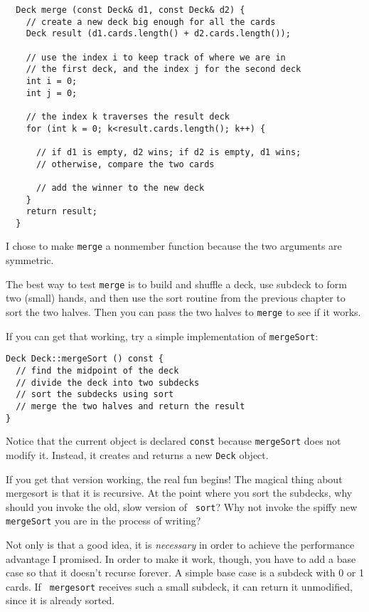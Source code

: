 \begin{lstlisting}
  Deck merge (const Deck& d1, const Deck& d2) {
    // create a new deck big enough for all the cards
    Deck result (d1.cards.length() + d2.cards.length());

    // use the index i to keep track of where we are in
    // the first deck, and the index j for the second deck
    int i = 0;
    int j = 0;
		
    // the index k traverses the result deck
    for (int k = 0; k<result.cards.length(); k++) {
			
      // if d1 is empty, d2 wins; if d2 is empty, d1 wins;
      // otherwise, compare the two cards
			
      // add the winner to the new deck
    }
    return result;
  }
\end{lstlisting}
%
I chose to make {\tt merge} a nonmember function because
the two arguments are symmetric.

The best way to test {\tt merge} is to build and shuffle a deck,
use subdeck to form two (small) hands, and then use the sort
routine from the previous chapter to sort the two halves.  Then
you can pass the two halves to {\tt merge} to see if it works.


If you can get that working, try a simple implementation of
{\tt mergeSort}:

\begin{lstlisting}
Deck Deck::mergeSort () const {
  // find the midpoint of the deck
  // divide the deck into two subdecks
  // sort the subdecks using sort
  // merge the two halves and return the result
}
\end{lstlisting}
%
Notice that the current object is declared {\tt const} because
{\tt mergeSort} does not modify it.  Instead, it creates and
returns a new {\tt Deck} object.

If you get that version working, the real fun begins!  The magical thing
about mergesort is that it is recursive.  At the point where you sort
the subdecks, why should you invoke the old, slow version of {\tt
sort}?  Why not invoke the spiffy new {\tt mergeSort} you are in the
process of writing?


Not only is that a good idea, it is {\em necessary} in order to
achieve the performance advantage I promised.  In order to make it
work, though, you have to add a base case so that it doesn't recurse
forever.  A simple base case is a subdeck with 0 or 1 cards.  If {\tt
mergesort} receives such a small subdeck, it can return it
unmodified, since it is already sorted.

